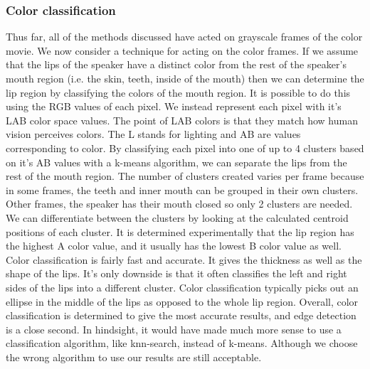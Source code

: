 \documentclass[a4paper,11pt]{article}
\begin{document}
\subsubsection{Color classification}
Thus far, all of the methods discussed have acted on grayscale frames of the color movie. We now consider a technique for acting on the color frames. If we assume that the lips of the speaker have a distinct color from the rest of the speaker's mouth region (i.e. the skin, teeth, inside of the mouth) then we can determine the lip region by classifying the colors of the mouth region. It is possible to do this using the RGB values of each pixel. We instead represent each pixel with it's LAB color space values. The point of LAB colors  is that they match how human vision perceives colors. The L stands for lighting and AB are values corresponding to color. By classifying each pixel into one of up to 4 clusters based on it's AB values with a k-means algorithm, we can separate the lips from the rest of the mouth region. The number of clusters created varies per frame because in some frames, the teeth and inner mouth can be grouped in their own clusters. Other frames, the speaker has their mouth closed so only 2 clusters are needed. We can differentiate between the clusters by looking at the calculated centroid positions of each cluster. It is determined experimentally that the lip region has the highest A color value, and it usually has the lowest B color value as well.  Color classification is fairly fast and accurate. It gives the thickness as well as the shape of the lips. It's only downside is that it often classifies the left and right sides of the lips into a different cluster. Color classification typically picks out an ellipse in the middle of the lips as opposed to the whole lip region. Overall, color classification is determined to give the most accurate results, and edge detection is a close second. In hindsight, it would have made much more sense to use a classification algorithm, like knn-search, instead of k-means. Although we choose the wrong algorithm to use our results are still acceptable. \par
 
\end{document}
